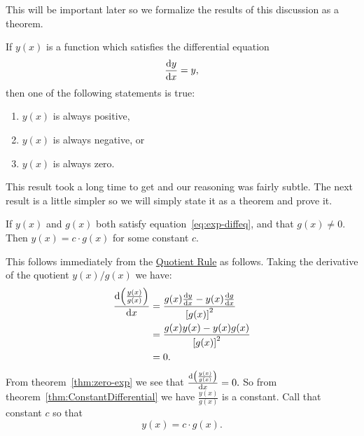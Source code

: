
This will be important later so we formalize the results of this
discussion as a theorem.

\begin{mytheorem}
  \label{thm:zero-exp}
  If $y(x)$ is a function which satisfies the differential equation 
  \begin{equation}
    \label{eq:exp-diffeq}
     \frac{\text{d}{y}}{\text{d}{x}} = y,
  \end{equation}
then one of the following statements is true:
\begin{enumerate}
\item $y(x)$ is always positive,
\item $y(x)$ is always negative, or
\item $y(x)$ is always zero.
\end{enumerate}
\end{mytheorem}

This result took a long time to get and our reasoning was fairly
subtle. The next result is a little simpler so we will simply state it
as a theorem and prove it.

\begin{mytheorem}
  \label{thm:exp-multiple}
  If $y(x)$ and $g(x)$ both satisfy equation~\ref{eq:exp-diffeq}, and
  that $g(x)\neq0.$ Then $y(x) = c\cdot g(x)$ for some constant $c.$
\end{mytheorem}
\begin{myproof}
  This follows immediately from the
  \hyperref[thm:quotient-rule]{Quotient Rule} as follows. 
Taking the derivative of the quotient $y(x)/g(x)$ we have:
\begin{align*}
  \frac{\text{d}{\left(\frac{y(x)}{g(x)}\right)}}{\text{d}{x}} &=
                        \frac{g(x)\frac{\text{d}{y}}{\text{d}{x}}-y(x)\frac{\text{d}{g}}{\text{d}{x}}}{\left[g(x)\right]^2} \\
                      &=\frac{g(x)y(x)-y(x)g(x)}{\left[g(x)\right]^2} \\
                      &=0.
\end{align*}
From theorem~\ref{thm:zero-exp} we see that
$\frac{\text{d}{\left(\frac{y(x)}{g(x)}\right)}}{\text{d}{x}}=0.$ So from
theorem~\ref{thm:ConstantDifferential} we have
$\frac{y(x)}{g(x)}$ is a constant. Call that constant $c$ so that
$$
y(x) = c\cdot g(x).
$$
\end{myproof}

